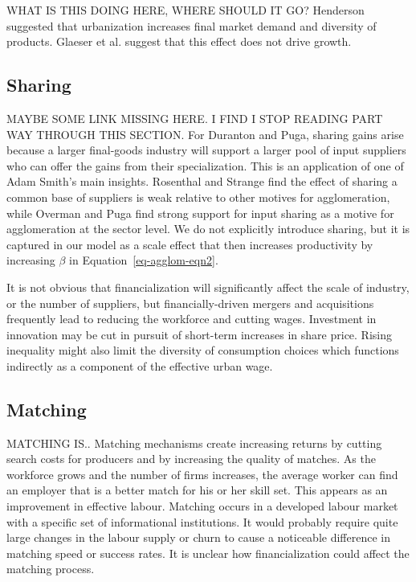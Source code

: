  WHAT IS THIS DOING HERE, WHERE SHOULD IT GO? Henderson \cite{Henderson1972Sizes} suggested that urbanization increases final market demand and diversity of products. Glaeser et al. \cite{glaeserGrowthCities1991a} suggest that this effect does not drive growth. 
 
\subsection{Sharing}
MAYBE SOME LINK MISSING HERE. I FIND I STOP READING PART WAY THROUGH THIS SECTION.
For Duranton and Puga, sharing gains arise because a larger final-goods industry will support a larger pool of input suppliers who can offer the gains from their specialization. This is an application of one of Adam Smith's main insights. Rosenthal and Strange \cite{rosenthalEvidenceNatureSources2004} find the effect of sharing a common base of suppliers is weak relative to other motives for agglomeration, while  Overman and Puga \cite{overmanLaborPoolingSource2010} find strong support for input sharing as a motive for agglomeration at the sector level. We do not explicitly introduce sharing, but it is captured in our model as a scale effect that then increases productivity by increasing $\beta$ in Equation~\ref{eq-agglom-eqn2}. 

It is not obvious that financialization will significantly affect the scale of industry, or the number of suppliers, but financially-driven mergers and acquisitions frequently lead to reducing the workforce and cutting wages. Investment in innovation may be cut in pursuit of short-term increases in share price.  Rising inequality might also limit the diversity of consumption choices which functions indirectly as a component of the effective urban wage. 
 
\subsection{Matching}
MATCHING IS.. 
Matching mechanisms create increasing returns by cutting search costs for producers and by increasing the quality of matches. As the workforce grows and the number of firms increases, the average worker can find an employer that is a better match for his or her skill set. This appears as an improvement in effective labour. Matching occurs in a developed labour market with a specific set of informational institutions. It would probably require quite large changes in the labour supply or churn to cause a noticeable difference in matching speed or success rates. It is unclear how financialization could affect the matching process.

